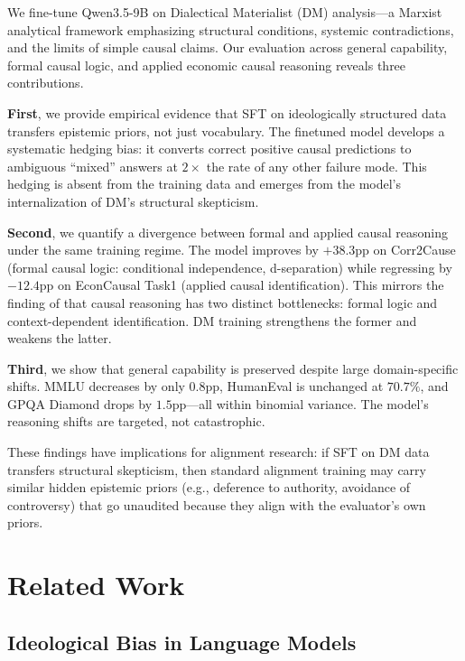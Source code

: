 \documentclass{article}
\begin{document}
We fine-tune Qwen3.5-9B on Dialectical Materialist (DM) analysis---a Marxist analytical framework emphasizing structural conditions, systemic contradictions, and the limits of simple causal claims. Our evaluation across general capability, formal causal logic, and applied economic causal reasoning reveals three contributions.

\textbf{First}, we provide empirical evidence that SFT on ideologically structured data transfers epistemic priors, not just vocabulary. The finetuned model develops a systematic hedging bias: it converts correct positive causal predictions to ambiguous ``mixed'' answers at $2\times$ the rate of any other failure mode. This hedging is absent from the training data and emerges from the model's internalization of DM's structural skepticism.

\textbf{Second}, we quantify a divergence between formal and applied causal reasoning under the same training regime. The model improves by $+38.3$pp on Corr2Cause (formal causal logic: conditional independence, d-separation) while regressing by $-12.4$pp on EconCausal Task1 (applied causal identification). This mirrors the finding of \citet{syrgkanis2026causalreasoning} that causal reasoning has two distinct bottlenecks: formal logic and context-dependent identification. DM training strengthens the former and weakens the latter.

\textbf{Third}, we show that general capability is preserved despite large domain-specific shifts. MMLU decreases by only $0.8$pp, HumanEval is unchanged at $70.7\%$, and GPQA Diamond drops by $1.5$pp---all within binomial variance. The model's reasoning shifts are targeted, not catastrophic.

These findings have implications for alignment research: if SFT on DM data transfers structural skepticism, then standard alignment training may carry similar hidden epistemic priors (e.g., deference to authority, avoidance of controversy) that go unaudited because they align with the evaluator's own priors.

\section{Related Work}

\subsection{Ideological Bias in Language Models}
\end{document}
